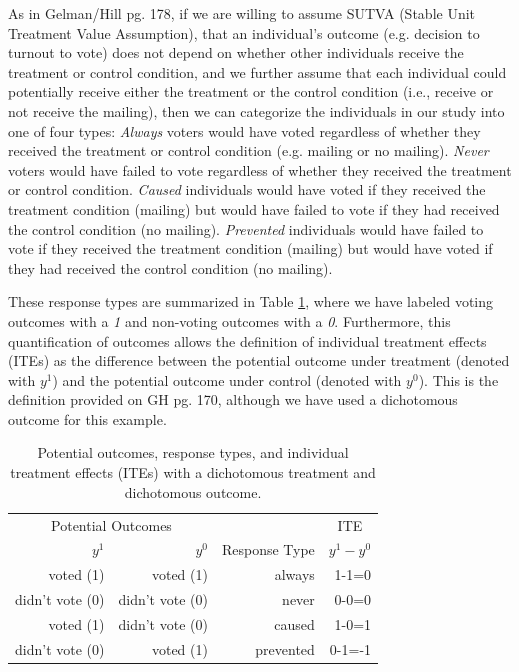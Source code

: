 \documentclass{article}
\begin{document}
As in Gelman/Hill pg. 178, if we are willing to assume SUTVA (Stable Unit Treatment Value Assumption), that an individual's outcome (e.g. decision to turnout to vote) does not depend on whether other individuals receive the treatment or control condition, and we further assume that each individual could potentially receive either the treatment or the control condition (i.e., receive or not receive the mailing), then we can categorize the individuals in our study into one of four types: \emph{Always} voters would have voted regardless of whether they received the treatment or control condition (e.g. mailing or no mailing). \emph{Never} voters would have failed to vote regardless of whether they received the treatment or control condition. \emph{Caused} individuals would have voted if they received the treatment condition (mailing) but would have failed to vote if they had received the control condition (no mailing). \emph{Prevented} individuals would have failed to vote if they received the treatment condition (mailing) but would have voted if they had received the control condition (no mailing). 

These response types are summarized in Table \ref{t:types}, where we have labeled voting outcomes with a \emph{1} and non-voting outcomes with a \emph{0}. Furthermore, this quantification of outcomes allows the definition of individual treatment effects (ITEs) as the difference between the potential outcome under treatment (denoted with $y^1$) and the potential outcome under control (denoted with $y^0$). This is the definition provided on GH pg. 170, although we have used a dichotomous outcome for this example. 


\begin{table}
\begin{center}
\caption{\label{t:types}Potential outcomes, response types, and individual treatment effects (ITEs) with a dichotomous treatment and dichotomous outcome.}
\begin{tabular}{rr | r | r}
\hline \hline
\multicolumn{2}{c|}{Potential Outcomes} & & \multicolumn{1}{c}{ITE}\\
$y^1$ & $y^0$ & Response Type & $y^1 - y^0$ \\
\hline
voted (1) & voted (1) & always & 1-1=0 \\
didn't vote (0) & didn't vote (0) & never & 0-0=0 \\
voted (1)& didn't vote (0) & caused & 1-0=1  \\
didn't vote (0) & voted (1)& prevented & 0-1=-1 \\
\hline \hline
\end{tabular}
\end{center}
\end{table}
\end{document}
